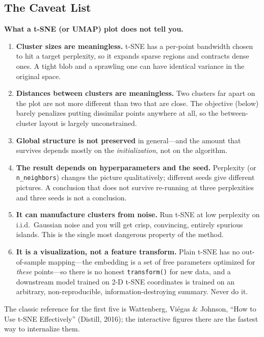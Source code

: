 \subsection{The Caveat List}

\begin{warningbox}
\textbf{What a t-SNE (or UMAP) plot does not tell you.}
\begin{enumerate}
    \item \textbf{Cluster sizes are meaningless.} t-SNE has a per-point bandwidth chosen to hit a target perplexity, so it expands sparse regions and contracts dense ones. A tight blob and a sprawling one can have identical variance in the original space.
    \item \textbf{Distances between clusters are meaningless.} Two clusters far apart on the plot are not more different than two that are close. The objective (below) barely penalizes putting dissimilar points anywhere at all, so the between-cluster layout is largely unconstrained.
    \item \textbf{Global structure is not preserved} in general---and the amount that survives depends mostly on the \emph{initialization}, not on the algorithm.
    \item \textbf{The result depends on hyperparameters and the seed.} Perplexity (or \texttt{n\_neighbors}) changes the picture qualitatively; different seeds give different pictures. A conclusion that does not survive re-running at three perplexities and three seeds is not a conclusion.
    \item \textbf{It can manufacture clusters from noise.} Run t-SNE at low perplexity on i.i.d.\ Gaussian noise and you will get crisp, convincing, entirely spurious islands. This is the single most dangerous property of the method.
    \item \textbf{It is a visualization, not a feature transform.} Plain t-SNE has no out-of-sample mapping---the embedding is a set of free parameters optimized for \emph{these} points---so there is no honest \texttt{transform()} for new data, and a downstream model trained on 2-D t-SNE coordinates is trained on an arbitrary, non-reproducible, information-destroying summary. Never do it.
\end{enumerate}
The classic reference for the first five is Wattenberg, Viégas \& Johnson, ``How to Use t-SNE Effectively'' (Distill, 2016); the interactive figures there are the fastest way to internalize them.
\end{warningbox}

